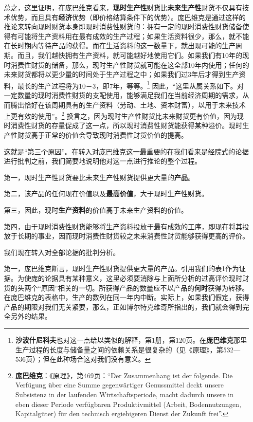 \documentclass[fontset=fandol, a4paper, 12pt, openright]{ctexbook}
\begin{document}
总之，这里证明，在庞巴维克看来，\textbf{现时生产性}财货比\textbf{未来生产性}财货不仅具有技术优势，而且具有\textbf{经济}优势（即价格结算条件下的优势）。庞巴维克是通过这样的推论来转向现时财货本身即现时消费性财货的：拥有一定的现时消费性财货储备使得有可能将生产资料用在最有成效的生产过程；如果生活资料很少，那么，就不能在长时期内等待产品的获得。而在生活资料的这一数量下，就出现可能的生产周期。而且，我们越快拥有生产资料，就可能越好地使用它们。如果我们有10年的现时消费性财货的储备，那么，现时生产性财货就可能在这全部10年内使用；任何的未来财货都将以更少量的时间处于生产过程之中；如果我们过3年后才得到生产资料，最长的生产过程将为10－3，即7年，等等。\footnote{\textbf{沙波什尼科夫}也对这一点给以类似的解释，第1册，第120页。在\textbf{庞巴维克}那里生产过程的长度与储备量之间的依赖关系是很复杂的（见《原理》，第532—536页）；但在此种场合这对我们没有意义。} 因此，“这里从属关系如下。对一定数量的现时消费性财货的支配使用，能够满足我们在当前经济周期的需求，从而腾出恰好在该周期具有的生产资料（劳动、土地、资本财富），以用于未来技术上更有效的使用”。\footnote{\textbf{庞巴维克}：《原理》，第469页：“Der Zusammenhang ist der folgende. Die Verf\"{u}gung \"{u}ber eine Summe gegenw\"{a}rtiger Genussmittel deckt unsere Subsistenz in der laufenden Wirtschaftsperiode, macht dadurch unsere in eben dieser Periode verf\"{u}gbaren Produktivmittel (Arbeit, Bodennutzungen, Kapitalg\"{u}ter) f\"{u}r den technisch ergiebigeren Dienst der Zukunft frei”.} 换言之，因为现时生产性财货比未来财货更有价值，因为现时消费性财货的存量促成了这一点，所以现时消费性财货能获得某种溢价。现时生产性财货高于正常的价值会导致现时消费性财货价值的提高。

这就是“第三个原因”。在转入对庞巴维克这一最重要的在我们看来是经院式的论据进行批判之前，我们简要地说明他对这一点进行推论的整个过程。

第一，现时生产性财货要比未来生产性财货提供更大量的\textbf{产品}。

第二，该产品的任何现在价值以及\textbf{最高价值}，大于现时生产性财货。

第三，因此，现时\textbf{生产资料}的价值高于未来生产资料的价值。

第四，由于现时消费性财货能够将生产资料投放于最有成效的工序，即现在将其投放于长期的事业，因而现时消费性财货较之未来消费性财货能够获得更高的评价。

我们现在转入对全部论据的批判分析。

第一，庞巴维克断言，现时生产性财货提供更大量的产品。引用我们的表1作为证据。为使庞的论据具有某种意义，这里必须要消除与上面所分析的过高评价现时财货的头两个“原因”相关的一切。所获得产品的数量应不以产品的\textbf{何时}获得为转移。在庞巴维克的表格中，生产的数列在同一年内中断。实际上，如果我们假定，获得产品的期限对我们无关紧要，那么，正如博尔特克维奇所指出的，我们就会得到完全另外的结果。
\end{document}
